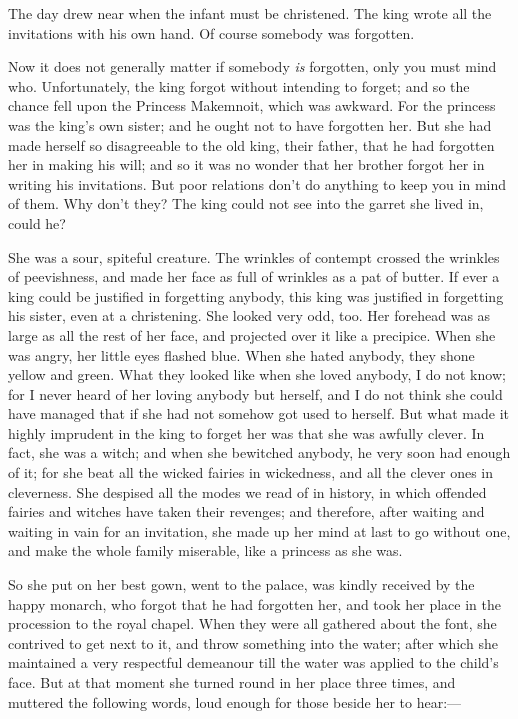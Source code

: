\documentclass[12pt]{memoir}
\begin{document}
The day drew near when the infant must be christened.  The king wrote
all the invitations with his own hand.  Of course somebody was
forgotten.

Now it does not generally matter if somebody \emph{is} forgotten, only
you must mind who.  Unfortunately, the king forgot without intending
to forget; and so the chance fell upon the Princess Makemnoit, which
was awkward.  For the princess was the king's own sister; and he ought
not to have forgotten her.  But she had made herself so disagreeable
to the old king, their father, that he had forgotten her in making his
will; and so it was no wonder that her brother forgot her in writing
his invitations.  But poor relations don't do anything to keep you in
mind of them.  Why don't they?  The king could not see into the garret
she lived in, could he?

She was a sour, spiteful creature.  The wrinkles of contempt crossed
the wrinkles of peevishness, and made her face as full of wrinkles as
a pat of butter.  If ever a king could be justified in forgetting
anybody, this king was justified in forgetting his sister, even at a
christening.  She looked very odd, too.  Her forehead was as large as
all the rest of her face, and projected over it like a precipice.
When she was angry, her little eyes flashed blue.  When she hated
anybody, they shone yellow and green.  What they looked like when she
loved anybody, I do not know; for I never heard of her loving anybody
but herself, and I do not think she could have managed that if she had
not somehow got used to herself.  But what made it highly imprudent in
the king to forget her was that she was awfully clever.  In fact, she
was a witch; and when she bewitched anybody, he very soon had enough
of it; for she beat all the wicked fairies in wickedness, and all the
clever ones in cleverness.  She despised all the modes we read of in
history, in which offended fairies and witches have taken their
revenges; and therefore, after waiting and waiting in vain for an
invitation, she made up her mind at last to go without one, and make
the whole family miserable, like a princess as she was.

So she put on her best gown, went to the palace, was kindly received
by the happy monarch, who forgot that he had forgotten her, and took
her place in the procession to the royal chapel.  When they were all
gathered about the font, she contrived to get next to it, and throw
something into the water; after which she maintained a very respectful
demeanour till the water was applied to the child's face.  But at that
moment she turned round in her place three times, and muttered the
following words, loud enough for those beside her to hear:---
\end{document}
